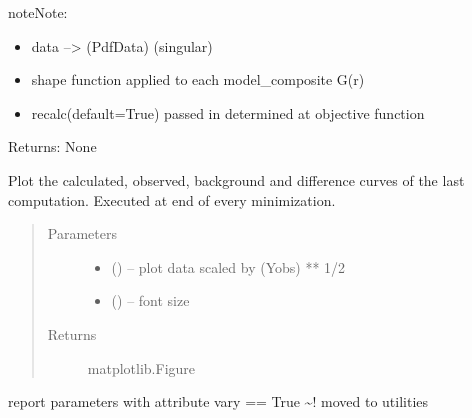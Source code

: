 \documentclass[letterpaper,10pt,english]{sphinxmanual}
\begin{document}
\begin{fulllineitems}
\begin{fulllineitems}
\begin{sphinxadmonition}{note}{Note:}
\begin{itemize}
\item {} 
data --\textgreater{} (PdfData) (singular)

\item {} 
shape function applied to each model\_composite G(r)

\item {} 
recalc(default=True) passed in \textbar{} determined at objective function

\end{itemize}
\end{sphinxadmonition}

Returns: None

\end{fulllineitems}


\begin{fulllineitems}
\label{\detokenize{rst/pairdistributionfunction:mstack.pairdistributionfunction.PdfRefinement.plot_min_result}}
Plot the calculated, observed, background and difference curves
of the last computation. Executed at end of every minimization.
\begin{quote}\begin{description}
\item[{Parameters}] \leavevmode\begin{itemize}
\item {} 
 () -- plot data scaled by (Yobs) ** 1/2

\item {} 
 () -- font size

\end{itemize}

\item[{Returns}] \leavevmode
matplotlib.Figure

\end{description}\end{quote}

\end{fulllineitems}


\begin{fulllineitems}
\label{\detokenize{rst/pairdistributionfunction:mstack.pairdistributionfunction.PdfRefinement.report_refined}}
report parameters with attribute vary == True
\textasciitilde{}! moved to utilities


\end{fulllineitems}
\end{fulllineitems}
\end{document}
